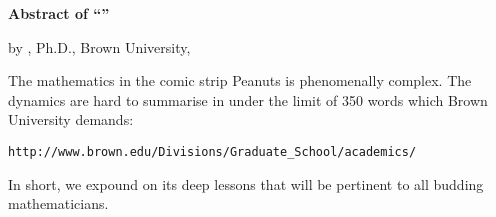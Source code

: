 

\centerline{{\bf Abstract of ``\thesistitle''}} 
\centerline{by \myname, Ph.D., Brown University, \thesismonth~\thesisyear}
 
 \bigskip


The mathematics in the comic strip Peanuts is phenomenally complex. The dynamics are hard to summarise in  under the limit of 350 words which Brown University demands:
\begin{verbatim}
http://www.brown.edu/Divisions/Graduate_School/academics/
\end{verbatim}
In short, we expound on its deep lessons that will be pertinent to all budding mathematicians.



\thispagestyle{empty} \hbox{   } \newpage